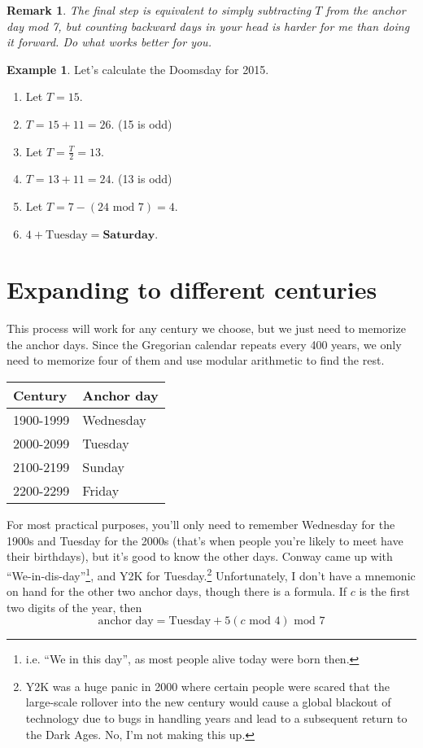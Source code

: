 \documentclass[12pt,letterpaper]{article}
\theoremstyle{plain}
\newtheorem*{remark}{Remark}
\theoremstyle{definition}
\newtheorem{example}{Example}
\begin{document}
\begin{remark}
	The final step is equivalent to simply subtracting \(T\) from the anchor day mod 7, but counting backward days in your head is harder for me than doing it forward. Do what works better for you. 
\end{remark}

\begin{example}
	Let's calculate the Doomsday for 2015. 

	\begin{enumerate}
		\item Let \(T=15\).
		\item \(T=15+11=26\). (15 is odd)
		\item Let \(T=\frac{T}{2}=13\). 
		\item \(T=13+11=24\). (13 is odd)
		\item Let \(T=7-(24 \text{ mod } 7)=4\). 
		\item \(4+\text{Tuesday}=\textbf{Saturday}\). 
	\end{enumerate}
\end{example}

\section{Expanding to different centuries}

This process will work for any century we choose, but we just need to memorize the anchor days. Since the Gregorian calendar repeats every 400 years, we only need to memorize four of them and use modular arithmetic to find the rest. 

\begin{center}
	\begin{tabular}{l|l}
	Century   & Anchor day \\ \hline
	1900-1999 & Wednesday  \\
	2000-2099 & Tuesday    \\
	2100-2199 & Sunday     \\
	2200-2299 & Friday    
	\end{tabular}
\end{center}

For most practical purposes, you'll only need to remember Wednesday for the 1900s and Tuesday for the 2000s (that's when people you're likely to meet have their birthdays), but it's good to know the other days. Conway came up with ``We-in-dis-day''\footnote{i.e. ``We in this day'', as most people alive today were born then.}, and Y2K for Tuesday.\footnote{Y2K was a huge panic in 2000 where certain people were scared that the large-scale rollover into the new century would cause a global blackout of technology due to bugs in handling years and lead to a subsequent return to the Dark Ages. No, I'm not making this up.} Unfortunately, I don't have a mnemonic on hand for the other two anchor days, though there is a formula. If \(c\) is the first two digits of the year, then 
\[\text{anchor day}=\text{Tuesday}+5(c\text{ mod } 4)\text{ mod } 7\]
\end{document}
